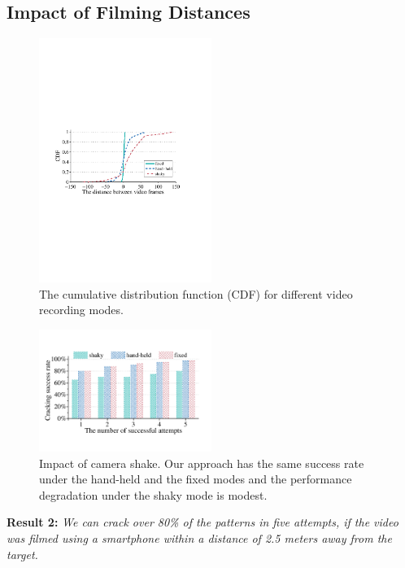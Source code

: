     \subsection{Impact of Filming Distances \label{sec:distances}}

\begin{figure}[t!]
    \centering
    \vspace{0.1cm}
    \includegraphics[width=0.5\textwidth]{fig/13.pdf}
    \caption{The cumulative distribution function (CDF) for different video recording modes.}
    \label{fig:fig13}
\end{figure}

\begin{figure}[!t]
    \centering
    \includegraphics[width=0.5\textwidth]{fig/14.pdf}
    \caption{Impact of camera shake. Our approach has the same success rate under the hand-held and the fixed modes and the performance degradation under the shaky mode is modest. }
    \label{fig:fig14}
\end{figure}

        \noindent \textbf{Result 2:} \emph{We can crack over 80\% of the patterns in five attempts, if the video was filmed using a smartphone within a distance of 2.5 meters away from the target.}

